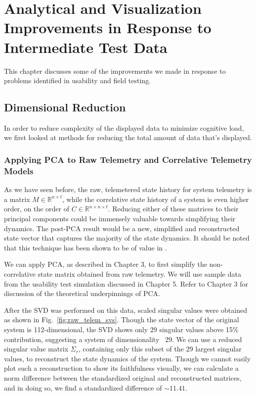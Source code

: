 
\chapter{Analytical and Visualization Improvements in Response to Intermediate Test Data}

This chapter discusses some of the improvements we made in response to problems identified in usability and field testing.

\section{Dimensional Reduction}

In order to reduce complexity of the displayed data to minimize cognitive load, we first looked at methods for reducing the total amount of data that's displayed.

\subsection{Applying PCA to Raw Telemetry and Correlative Telemetry Models}

As we have seen before, the raw, telemetered state history for system telemetry is a matrix $M \in \mathbb{R}^{n \times t}$, while the correlative state history of a system is even higher order, on the order of $C \in \mathbb{R}^{n \times n \times t}$. Reducing either of these matrices to their principal components could be immensely valuable towards simplifying their dynamics. The post-PCA result would be a new, simplified and reconstructed state vector that captures the majority of the state dynamics. It should be noted that this technique has been shown to be of value in \cite{villegas2010principal}.

We can apply PCA, as described in Chapter 3, to first simplify the non-correlative state matrix obtained from raw telemetry. We will use sample data from the usability test simulation discussed in Chapter 5. Refer to Chapter 3 for discussion of the theoretical underpinnings of PCA.

After the SVD was performed on this data, scaled singular values were obtained as shown in Fig.~\ref{fig:raw_telem_svs}. Though the state vector of the original system is 112-dimensional, the SVD shows only 29 singular values above 15\% contribution, suggesting a system of dimensionality ~29. We can use a reduced singular value matrix $\Sigma_{r}$, containing only this subset of the 29 largest singular values, to reconstruct the state dynamics of the system. Though we cannot easily plot such a reconstruction to show its faithfulness visually, we can calculate a norm difference between the standardized original and reconstructed matrices, and in doing so, we find a standardized difference of $\sim11.41$.

